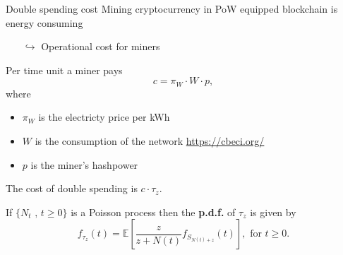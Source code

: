 \documentclass{beamer}
\begin{document}
\begin{frame}{Double spending cost}
\scriptsize
Mining cryptocurrency in PoW equipped blockchain is energy consuming
\begin{itemize}
\item[$\hookrightarrow$] Operational cost for miners
\end{itemize}
Per time unit a miner pays
$$
c = \pi_W\cdot W\cdot p,
$$
where 
\begin{itemize}
  \item $\pi_W$ is the electricty price per kWh
  \item $W$ is the consumption of the network \url{https://cbeci.org/}
  \item  $p$ is the miner's hashpower 
\end{itemize}
\begin{tcolorbox}[enhanced,drop shadow, title=Fact]
The cost of double spending is $c\cdot \tau_z$.
\end{tcolorbox}
\begin{tcolorbox}[enhanced,drop shadow, title=Theorem (\textbf{P.d.f.} of the double spending time)]
If $\{N_t\text{ , }t\geq0\}$ is a Poisson process then the \textbf{p.d.f.} of $\tau_z$ is given by
\begin{equation*}
f_{\tau_z}(t)=\mathbb{E}\left[\frac{z}{z+N(t)}f_{S_{N(t)+z}}(t)\right],\text{ for }t\geq0.
\end{equation*}
\end{tcolorbox}
\end{frame}
\end{document}
